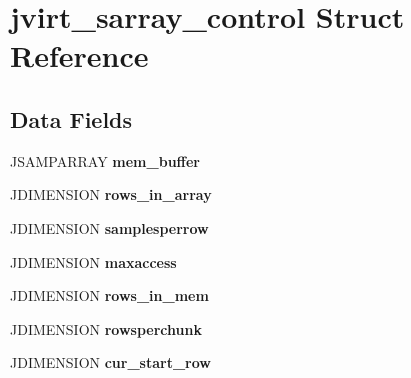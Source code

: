 \hypertarget{structjvirt__sarray__control}{}\section{jvirt\+\_\+sarray\+\_\+control Struct Reference}
\label{structjvirt__sarray__control}
\subsection*{Data Fields}
\begin{DoxyCompactItemize}
\item 
\mbox{\label{structjvirt__sarray__control_a00827496c71e1175d427a57b83ce6d00}} 
J\+S\+A\+M\+P\+A\+R\+R\+AY {\bfseries mem\+\_\+buffer}
\item 
\mbox{\label{structjvirt__sarray__control_a48dd96e369ff5366a4786d7d2a9e32aa}} 
J\+D\+I\+M\+E\+N\+S\+I\+ON {\bfseries rows\+\_\+in\+\_\+array}
\item 
\mbox{\label{structjvirt__sarray__control_a105d3b327ab151ff75542249202919c0}} 
J\+D\+I\+M\+E\+N\+S\+I\+ON {\bfseries samplesperrow}
\item 
\mbox{\label{structjvirt__sarray__control_ac9f087e8d0dc706f4ce2c558dfbe820b}} 
J\+D\+I\+M\+E\+N\+S\+I\+ON {\bfseries maxaccess}
\item 
\mbox{\label{structjvirt__sarray__control_a72c5563978cef0ed93381c1c97e185e0}} 
J\+D\+I\+M\+E\+N\+S\+I\+ON {\bfseries rows\+\_\+in\+\_\+mem}
\item 
\mbox{\label{structjvirt__sarray__control_af0c604d6fa92d9ef5712dac1e009b373}} 
J\+D\+I\+M\+E\+N\+S\+I\+ON {\bfseries rowsperchunk}
\item 
\mbox{\label{structjvirt__sarray__control_ab4f81df1ac15f204650f12feffe0738c}} 
J\+D\+I\+M\+E\+N\+S\+I\+ON {\bfseries cur\+\_\+start\+\_\+row}
\item 
\mbox{\label{structjvirt__sarray__control_aee6ff0d2698bfaabc9a6782020beccb1}} 

\end{DoxyCompactItemize}
